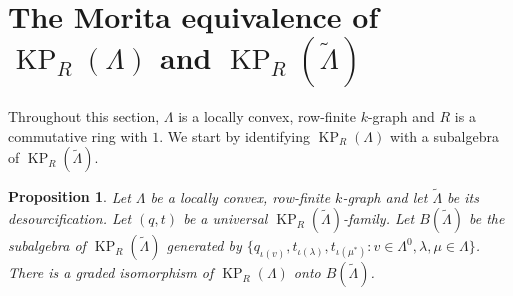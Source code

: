 \documentclass[a4paper,12pt]{amsart}
\numberwithin{equation}{section}
\newtheorem{prop}[thm]{Proposition}
\theoremstyle{definition}
\theoremstyle{remark}
\begin{document}
\section{The Morita equivalence of  $\operatorname{KP}_R(\Lambda)$ and  $\operatorname{KP}_R({\tilde{\Lambda}})$}\label{sec-Morita}
Throughout this section, $\Lambda$ is a locally convex, row-finite $k$-graph and $R$ is a commutative ring with $1$.
We start by identifying $\operatorname{KP}_R(\Lambda)$ with a subalgebra of $\operatorname{KP}_R({\tilde{\Lambda}})$.
\begin{prop}
\label{prop:Claire_Prop_11''}
Let $\Lambda$ be a locally convex, row-finite $k$-graph and let $\tilde{\Lambda}$ be its 
desourcification. Let $(q,t)$ be  a universal  $\operatorname{KP}_R(\tilde{\Lambda})$-family.
Let $B(\tilde\Lambda)$ be the subalgebra  of $\operatorname{KP}_R(\tilde{\Lambda})$ generated by $\{q_{\iota(v)},
 t_{\iota(\lambda)}, t_{\iota(\mu^*)}:v\in\Lambda^0, \lambda,\mu\in\Lambda\}$. There is a  graded isomorphism of  $\operatorname{KP}_R(\Lambda)$ onto $B(\tilde\Lambda)$. 
\end{prop}
\end{document}
